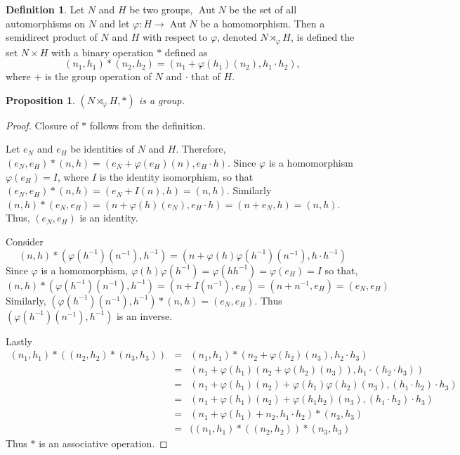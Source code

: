 \documentclass{article}
\DeclareMathOperator{\aut}{Aut}
\theoremstyle{plain}
\numberwithin{thm}{section}
\theoremstyle{plain}
\newtheorem{prop}{Proposition}
\numberwithin{prop}{section}
\theoremstyle{definition}
\newtheorem{defn}{Definition}
\numberwithin{defn}{section}
\theoremstyle{remark}
\numberwithin{equation}{section}
\begin{document}
\begin{defn}\label{s7d2}
Let $N$ and $H$ be two groups, $\aut{N}$ be the set of all automorphisms on $N$ 
and let $\varphi : H \rightarrow \aut{N}$ be a homomorphism. Then a semidirect 
product of $N$ and $H$ with respect to $\varphi$, denoted $N \rtimes_\varphi H$,
is defined the set $N \times H$ with a binary operation $\ast$ defined as
\[
(n_1, h_1)\ast(n_2, h_2) = (n_1 + \varphi(h_1)(n_2), h_1 \cdot h_2),
\]
where $+$ is the group operation of $N$ and $\cdot$ that of $H$.
\end{defn}

\begin{prop}\label{s7t2}
$(N \rtimes_\varphi H, \ast)$ is a group.
\end{prop}
\begin{proof}
Closure of $\ast$ follows from the definition. 

Let $e_N$ and $e_H$ be identities of $N$ and $H$. Therefore, $(e_N, e_H)\ast
(n, h) = (e_N + \varphi(e_H)(n), e_H \cdot h)$. Since $\varphi$ is a 
homomorphism $\varphi(e_H) = I$, where $I$ is the identity isomorphism, so that 
$(e_N, e_H)\ast(n, h) = (e_N + I(n), h) = (n, h)$. Similarly $(n, h)\ast
(e_N, e_H) = (n + \varphi(h)(e_N), e_H \cdot h) = (n + e_N, h) = (n, h)$. Thus, 
$(e_N, e_H)$ is an identity.

Consider 
\[
(n, h) \ast (\varphi(h^{-1})(n^{-1}), h^{-1}) = 
(n + \varphi(h)\varphi(h^{-1})(n^{-1}), h\cdot h^{-1})
\]
Since $\varphi$ is a homomorphism, $\varphi(h)\varphi(h^{-1}) = \varphi(hh^{-1})
 = \varphi(e_H) = I$ so that,
\[
(n, h) \ast (\varphi(h^{-1})(n^{-1}), h^{-1}) = 
(n + I(n^{-1}), e_H) = (n + n^{-1}, e_H) = (e_N, e_H)
\]
Similarly, $(\varphi(h^{-1})(n^{-1}), h^{-1}) \ast (n, h) = (e_N, e_H)$. Thus 
$(\varphi(h^{-1})(n^{-1}), h^{-1})$ is an inverse.

Lastly 
\begin{eqnarray*}
(n_1, h_1) \ast ((n_2, h_2) \ast (n_3, h_3)) &=& 
(n_1, h_1) \ast (n_2 + \varphi(h_2)(n_3), h_2 \cdot h_3) \\
 &=& (n_1 + \varphi(h_1)(n_2 + \varphi(h_2)(n_3)), h_1 \cdot (h_2 \cdot h_3)) \\
 &=& (n_1 + \varphi(h_1)(n_2) + \varphi(h_1)\varphi(h_2)(n_3), (h_1 \cdot h_2) 
 \cdot h_3) \\
 &=& (n_1 + \varphi(h_1)(n_2) + \varphi(h_1h_2)(n_3), (h_1 \cdot h_2) \cdot h_3) \\
 &=& (n_1 + \varphi(h_1) + n_2, h_1 \cdot h_2) \ast (n_3, h_3) \\
 &=& ((n_1, h_1) \ast ((n_2, h_2)) \ast (n_3, h_3)
\end{eqnarray*}
Thus $\ast$ is an associative operation.
\end{proof}
\end{document}
